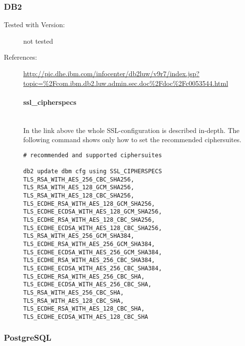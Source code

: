 \subsubsection{DB2}
\begin{description}
\item[Tested with Version:] not tested

\item[References:]
{\small \url{http://pic.dhe.ibm.com/infocenter/db2luw/v9r7/index.jsp?topic=%2Fcom.ibm.db2.luw.admin.sec.doc%2Fdoc%2Fc0053544.html}}


\paragraph*{ssl\_cipherspecs}\mbox{}\\
In the link above the whole SSL-configuration is described in-depth. The following command shows only how to set the recommended ciphersuites.
\begin{lstlisting}[breaklines]
# recommended and supported ciphersuites 

db2 update dbm cfg using SSL_CIPHERSPECS 
TLS_RSA_WITH_AES_256_CBC_SHA256,
TLS_RSA_WITH_AES_128_GCM_SHA256,
TLS_RSA_WITH_AES_128_CBC_SHA256,
TLS_ECDHE_RSA_WITH_AES_128_GCM_SHA256,
TLS_ECDHE_ECDSA_WITH_AES_128_GCM_SHA256,
TLS_ECDHE_RSA_WITH_AES_128_CBC_SHA256,
TLS_ECDHE_ECDSA_WITH_AES_128_CBC_SHA256,
TLS_RSA_WITH_AES_256_GCM_SHA384,
TLS_ECDHE_RSA_WITH_AES_256_GCM_SHA384,
TLS_ECDHE_ECDSA_WITH_AES_256_GCM_SHA384,
TLS_ECDHE_RSA_WITH_AES_256_CBC_SHA384,
TLS_ECDHE_ECDSA_WITH_AES_256_CBC_SHA384,
TLS_ECDHE_RSA_WITH_AES_256_CBC_SHA,
TLS_ECDHE_ECDSA_WITH_AES_256_CBC_SHA,
TLS_RSA_WITH_AES_256_CBC_SHA,
TLS_RSA_WITH_AES_128_CBC_SHA,
TLS_ECDHE_RSA_WITH_AES_128_CBC_SHA,
TLS_ECDHE_ECDSA_WITH_AES_128_CBC_SHA

\end{lstlisting}

\end{description}


\subsubsection{PostgreSQL}

